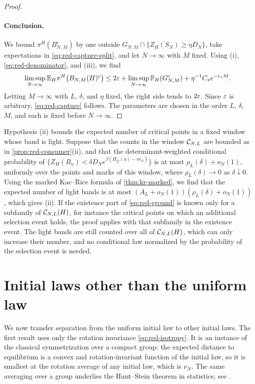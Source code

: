 \begin{proof}
\paragraph{Conclusion.}
We bound $\pi^H(B_{N,M}^c)$ by one outside $G_{N,M}\cap\{Z_H(S_N)\ge\eta D_N\}$, take expectations in \eqref{eq:red-capture-split}, and let $N\to\infty$ with $M$ fixed. Using (i), \eqref{eq:red-denominator}, and (iii), we find
\begin{equation*}
\limsup_{N\to\infty}\mathbb E_H\pi^H\bigl(B_{N,M}(H)^c\bigr)\le2\varepsilon+\limsup_{N\to\infty}\mathbb P_H(G_{N,M}^c)+\eta^{-1}C_*e^{-c_*M}.
\end{equation*}
Letting $M\to\infty$ with $L$, $\delta$, and $\eta$ fixed, the right side tends to $2\varepsilon$. Since $\varepsilon$ is arbitrary, \eqref{eq:red-capture} follows. The parameters are chosen in the order $L$, $\delta$, $M$, and each is fixed before $N\to\infty$.
\end{proof}

\begin{remark}[On hypothesis (ii)]\label{rem:red-capture-filter}
Hypothesis (ii) bounds the expected number of critical points in a fixed window whose band is light. Suppose that the counts in the window $\mathcal C_{N,L}$ are bounded as in \cref{prop:red-consumer}(ii), and that the determinant-weighted conditional probability of $\{Z_H(B_u)<\delta D_Ne^{\beta(H_Q(u)-m_N)}\}$ is at most $\rho_L(\delta)+o_N(1)$, uniformly over the points and marks of this window, where $\rho_L(\delta)\to0$ as $\delta\downarrow0$. Using the marked Kac--Rice formula of \cref{thm:kr-marked}, we find that the expected number of light bands is at most $(A_L+o_N(1))(\rho_L(\delta)+o_N(1))$, which gives (ii). If the existence part of \eqref{eq:red-ground} is known only for a subfamily of $\mathcal C_{N,L}(H)$, for instance the critical points on which an additional selection event holds, the proof applies with that subfamily in the existence event. The light bands are still counted over all of $\mathcal C_{N,L}(H)$, which can only increase their number, and no conditional law normalized by the probability of the selection event is needed.
\end{remark}

\section{Initial laws other than the uniform law}\label{sec:red-initial}

We now transfer separation from the uniform initial law to other initial laws. The first result uses only the rotation invariance \eqref{eq:red-isotropy}. It is an instance of the classical symmetrization over a compact group: the expected distance to equilibrium is a convex and rotation-invariant function of the initial law, so it is smallest at the rotation average of any initial law, which is $\nu_N$. The same averaging over a group underlies the Hunt--Stein theorem in statistics; see \citet[Section~8.5]{LehmannRomano2005}.

